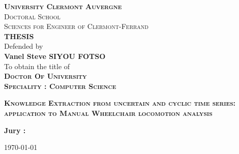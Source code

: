 \begin{titlepage}
\begin{center}
\large{ \textbf{ \textsc{University Clermont Auvergne} } }\\
\large{ \textsc{Doctoral School} }\\
\large{ \textsc{Sciences for Engineer of Clermont-Ferrand} }\\
\large{ \textbf{ \textsc{THESIS}}}\\
Defended by\\
\large{ \textbf{ Vanel Steve SIYOU FOTSO}}\\
To obtain the title of\\
\large{ \textbf{ \textsc{Doctor Of University}}}\\

\large{ \textbf{\textsc{ Speciality : Computer Science}}}\\

\end{center}
\hrulefill
\begin{center}\bfseries\Huge
    \textsc{Knowledge Extraction from uncertain and cyclic time series: application to Manual Wheelchair locomotion analysis}
\end{center}
\hrulefill
\vspace*{1cm}
    
\begin{center}%
\textbf{ Jury : }\\

\end{center}
\begin{flushright}
        \today 
\end{flushright}   
\end{titlepage}